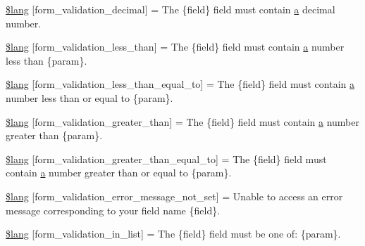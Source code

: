 \begin{DoxyCompactItemize}
\item 
\hyperlink{system_2language_2english_2form__validation__lang_8php_aaa48b480326c914d9b8aa16cabdc11f7}{\$lang} \mbox{[}\textquotesingle{}form\+\_\+validation\+\_\+decimal\textquotesingle{}\mbox{]} = \textquotesingle{}The \{field\} field must contain \hyperlink{_admin_2assets_2js_2bootstrap_8min_8js_a1f5870dcf487187f13d5fd328ed9e6e7}{a} decimal number.\textquotesingle{}
\item 
\hyperlink{system_2language_2english_2form__validation__lang_8php_aa3ee4ecc6cbaf35bf4708c7e8c2afcca}{\$lang} \mbox{[}\textquotesingle{}form\+\_\+validation\+\_\+less\+\_\+than\textquotesingle{}\mbox{]} = \textquotesingle{}The \{field\} field must contain \hyperlink{_admin_2assets_2js_2bootstrap_8min_8js_a1f5870dcf487187f13d5fd328ed9e6e7}{a} number less than \{param\}.\textquotesingle{}
\item 
\hyperlink{system_2language_2english_2form__validation__lang_8php_a687b3be07540d640e2b308086c855c83}{\$lang} \mbox{[}\textquotesingle{}form\+\_\+validation\+\_\+less\+\_\+than\+\_\+equal\+\_\+to\textquotesingle{}\mbox{]} = \textquotesingle{}The \{field\} field must contain \hyperlink{_admin_2assets_2js_2bootstrap_8min_8js_a1f5870dcf487187f13d5fd328ed9e6e7}{a} number less than or equal to \{param\}.\textquotesingle{}
\item 
\hyperlink{system_2language_2english_2form__validation__lang_8php_aa01f66851d0140114c2216e6ab5daf06}{\$lang} \mbox{[}\textquotesingle{}form\+\_\+validation\+\_\+greater\+\_\+than\textquotesingle{}\mbox{]} = \textquotesingle{}The \{field\} field must contain \hyperlink{_admin_2assets_2js_2bootstrap_8min_8js_a1f5870dcf487187f13d5fd328ed9e6e7}{a} number greater than \{param\}.\textquotesingle{}
\item 
\hyperlink{system_2language_2english_2form__validation__lang_8php_a255dc63d9dceb22751acebc1ffc43be8}{\$lang} \mbox{[}\textquotesingle{}form\+\_\+validation\+\_\+greater\+\_\+than\+\_\+equal\+\_\+to\textquotesingle{}\mbox{]} = \textquotesingle{}The \{field\} field must contain \hyperlink{_admin_2assets_2js_2bootstrap_8min_8js_a1f5870dcf487187f13d5fd328ed9e6e7}{a} number greater than or equal to \{param\}.\textquotesingle{}
\item 
\hyperlink{system_2language_2english_2form__validation__lang_8php_ad29f9046f70e4b900cf5283143de0618}{\$lang} \mbox{[}\textquotesingle{}form\+\_\+validation\+\_\+error\+\_\+message\+\_\+not\+\_\+set\textquotesingle{}\mbox{]} = \textquotesingle{}Unable to access an error message corresponding to your field name \{field\}.\textquotesingle{}
\item 
\hyperlink{system_2language_2english_2form__validation__lang_8php_ae48fb4c900d50c05f0939f9fec1262a2}{\$lang} \mbox{[}\textquotesingle{}form\+\_\+validation\+\_\+in\+\_\+list\textquotesingle{}\mbox{]} = \textquotesingle{}The \{field\} field must be one of\+: \{param\}.\textquotesingle{}
\end{DoxyCompactItemize}


